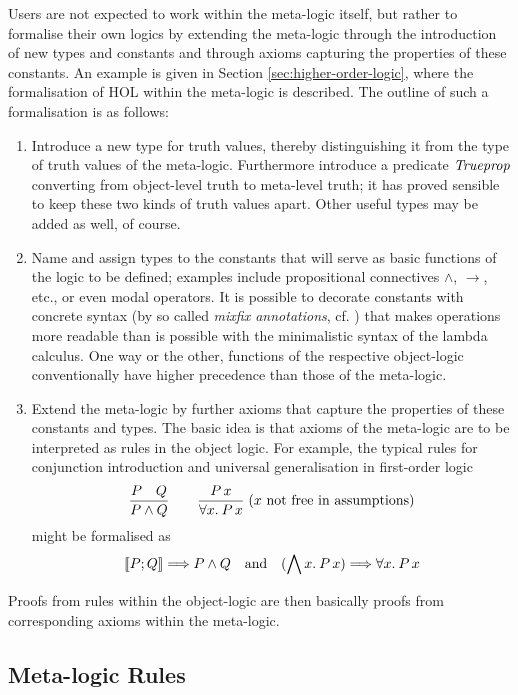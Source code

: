 Users are not expected to work within the meta-logic itself, but rather to
formalise their own logics by extending the meta-logic through the introduction
of new types and constants and through axioms capturing the properties of these
constants. An example is given in Section \ref{sec:higher-order-logic}, where
the formalisation of HOL within the meta-logic is described. The outline of such
a formalisation is as follows:
\begin{enumerate}
\item Introduce a new type for truth values, thereby distinguishing it from the
  type of truth values of the meta-logic. Furthermore introduce a predicate
  $\mathit{Trueprop}$ converting from object-level truth to meta-level truth; it
  has proved sensible to keep these two kinds of truth values apart. Other
  useful types may be added as well, of course.
\item Name and assign types to the constants that will serve as basic functions
  of the logic to be defined; examples include propositional connectives $\land$,
  $\longrightarrow$, etc., or even modal operators. It is possible to decorate constants with
  concrete syntax (by so called \emph{mixfix annotations}, cf. \cite{IsaRef04})
  that makes operations more readable than is possible with the minimalistic
  syntax of the lambda calculus. One way or the other, functions of the
  respective object-logic conventionally have higher precedence than those of
  the meta-logic.
\item Extend the meta-logic by further axioms that capture the properties of
  these constants and types. The basic idea is that axioms of the meta-logic are to be
  interpreted as rules in the object logic. For example, the typical
  rules for conjunction introduction and universal generalisation in first-order
  logic 
  \[ \frac{\displaystyle P\quad Q}{\displaystyle P \land Q}\qquad \frac{\displaystyle P\, x}{\displaystyle \forall x.\: P\, x}\;\text{($x$ not
    free in assumptions)}\]
  might be formalised as 
  \[ \llbracket P; Q\rrbracket \Longrightarrow P \land Q\quad\text{and}\quad (\bigwedge x.\: P\, x) \Longrightarrow \forall x.\: P\, x \]
\end{enumerate}
Proofs from rules within the object-logic are then basically proofs from
corresponding axioms within the meta-logic.


\subsection{Meta-logic Rules}
\label{sec:meta-logic-rules}

